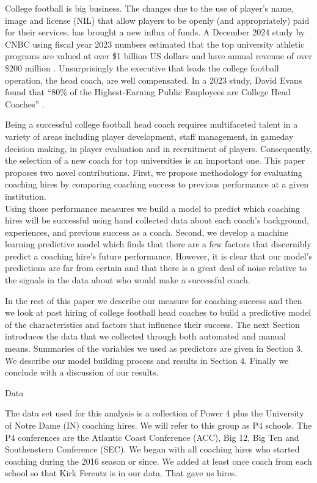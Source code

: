 \documentclass[
  12pt]{article}
\begin{document}
College football is big business. The changes due to the use of player's
name, image and license (NIL) that allow players to be openly (and
appropriately) paid for their services, has brought a new influx of
funds. A December 2024 study by CNBC using fiscal year 2023 numbers
estimated that the top university athletic programs are valued at over
\$1 billion US dollars and have annual revenue of over \$200 million
\citep{cnbc_college_worth}. Unsurprisingly the executive that leads the
college football operation, the head coach, are well compensated. In a
2023 study, David Evans found that ``80\% of the Highest-Earning Public
Employees are College Head Coaches'' \citep{highest_state}.

Being a successful college football head coach requires multifaceted
talent in a variety of areas including player development, staff
management, in gameday decision making, in player evaluation and in
recruitment of players. Consequently, the selection of a new coach for
top universities is an important one. This paper proposes two novel
contributions. First, we propose methodology for evaluating coaching
hires by comparing coaching success to previous performance at a given
institution.\\
Using those performance measures we build a model to predict which
coaching hires will be successful using hand collected data about each
coach's background, experiences, and previous success as a coach.
Second, we develop a machine learning predictive model which finds that
there are a few factors that discernibly predict a coaching hire's
future performance. However, it is clear that our model's predictions
are far from certain and that there is a great deal of noise relative to
the signals in the data about who would make a successful coach.

In the rest of this paper we describe our measure for coaching success
and then we look at past hiring of college football head coaches to
build a predictive model of the characteristics and factors that
influence their success. The next Section introduces the data that we
collected through both automated and manual means. Summaries of the
variables we used as predictors are given in Section 3. We describe our
model building process and results in Section 4. Finally we conclude
with a discussion of our results.

Data

The data set used for this analysis is a collection of Power 4 plus the
University of Notre Dame (IN) coaching hires. We will refer to this
group as P4 schools. The P4 conferences are the Atlantic Coast
Conference (ACC), Big 12, Big Ten and Southeastern Conference (SEC). We
began with all coaching hires who started coaching during the 2016
season or since. We added at least once coach from each school so that
Kirk Ferentz is in our data. That gave us hires.
\end{document}
